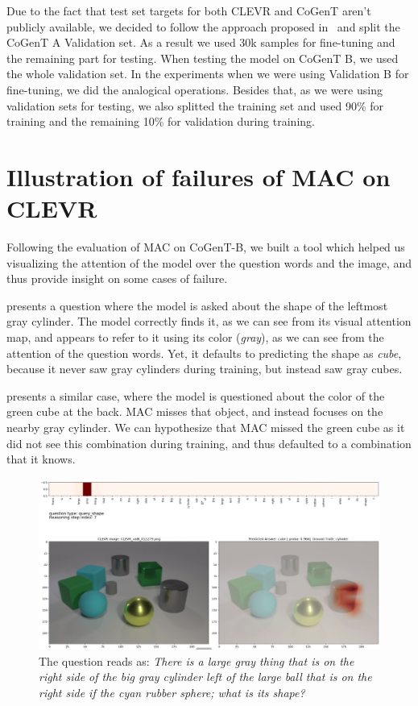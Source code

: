 Due to the fact that test set targets for both CLEVR and CoGenT aren't publicly available, we decided to follow the approach proposed in~\cite{perez2017film} and split the CoGenT A Validation set.
As a result we used 30k samples for fine-tuning and the remaining part for testing.
When testing the model on CoGenT B, we used the whole validation set.
In the experiments when we were using Validation B for fine-tuning, we did the analogical operations.
Besides that, as we were using validation sets for testing, we also splitted the training set and used 90\% for training and the remaining 10\% for validation during training.

\section{Illustration of failures of MAC on CLEVR}
Following the evaluation of MAC on CoGenT-B, we built a tool which helped us visualizing the attention of the model over the question words and the image, and thus provide insight on some cases of failure.

 presents a question where the model is asked about the shape of the leftmost gray cylinder. The model correctly finds it, as we can see from its visual attention map, and appears to refer to it using its color (\textit{gray}), as we can see from the attention of the question words. Yet, it defaults to predicting the shape as \textit{cube}, because it never saw gray cylinders during training, but instead saw gray cubes.

 presents a similar case, where the model is questioned about the color of the green cube at the back. MAC misses that object, and instead focuses on the nearby gray cylinder. We can hypothesize that MAC missed the green cube as it did not see this combination during training, and thus defaulted to a combination that it knows.


\begin{figure}[htbp]
	\centering
	\includegraphics[width=\textwidth]{img/fail_mac_cogent_b_shape.png}
	\caption{The question reads as: \textit{There is a large gray thing that is on the right side of the big gray cylinder left of the large ball that is on the right side if the cyan rubber sphere; what is its shape?}}
	\label{fig:fail_mac_shape}
\end{figure}


